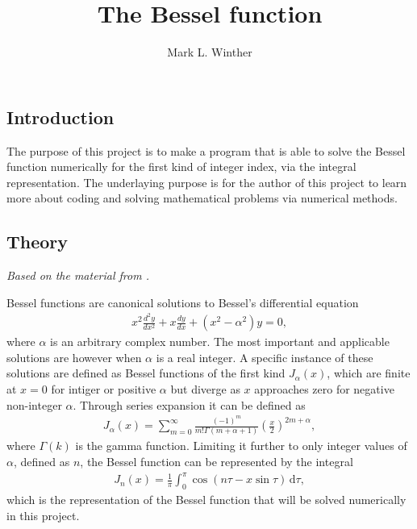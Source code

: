 \documentclass[twocolumn,article]{memoir}
\author{Mark L. Winther}
\title{The Bessel function}
\newcommand\dx[1]{\,\text{d}#1}
\begin{document}



\subsection*{Introduction}
The purpose of this project is to make a program that is able to solve the Bessel function numerically for the first kind of integer index, via the integral representation. The underlaying purpose is for the author of this project to learn more about coding and solving mathematical problems via numerical methods.

\subsection*{Theory}
\emph{Based on the material from \cite{wiki}.}

Bessel functions are canonical solutions to Bessel's differential equation
\begin{align}
	x^2\frac{d^2y}{dx^2}+x\frac{dy}{dx}+\left(x^2-\alpha^2\right)y=0,
\end{align}
where $\alpha$ is an arbitrary complex number. The most important and applicable solutions are however when $\alpha$ is a real integer. A specific instance of these solutions are defined as Bessel functions of the first kind $J_\alpha(x)$, which are finite at $x=0$ for intiger or positive $\alpha$ but diverge as $x$ approaches zero for negative non-integer $\alpha$. Through series expansion it can be defined as
\begin{align}
	J_\alpha(x) = \sum_{m=0}^\infty \frac{\left(-1\right)^m}{m!\Gamma\left(m+\alpha+1\right)}\left(\frac{x}{2}\right)^{2m+\alpha},
\end{align}
where $\Gamma(k)$ is the gamma function. Limiting it further to only integer values of $\alpha$, defined as $n$, the Bessel function can be represented by the integral
\begin{align}
	J_n(x) = \frac{1}{\pi} \int_0^\pi \cos\left(n\tau-x\sin\tau\right)\dx{\tau},
	\label{eq:Bessel}
\end{align}
which is the representation of the Bessel function that will be solved numerically in this project.
\end{document}
